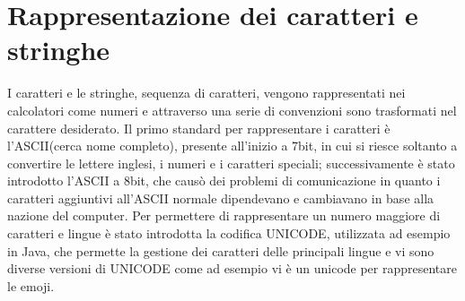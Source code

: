 \section{Rappresentazione dei caratteri e stringhe}
I caratteri e le stringhe, sequenza di caratteri, vengono rappresentati nei calcolatori
come numeri e attraverso una serie di convenzioni sono trasformati nel carattere desiderato.\newline
Il primo standard per rappresentare i caratteri è l'ASCII(cerca nome completo),
presente all'inizio a 7bit, in cui si riesce soltanto a convertire le lettere inglesi,
i numeri e i caratteri speciali; successivamente è stato introdotto l'ASCII a 8bit,
che causò dei problemi di comunicazione in quanto i caratteri aggiuntivi all'ASCII normale
dipendevano e cambiavano in base alla nazione del computer.
Per permettere di rappresentare un numero maggiore di caratteri e lingue è stato introdotta
la codifica UNICODE, utilizzata ad esempio in Java, che permette la gestione dei caratteri
delle principali lingue e vi sono diverse versioni di UNICODE come ad esempio vi è
un unicode per rappresentare le emoji.


